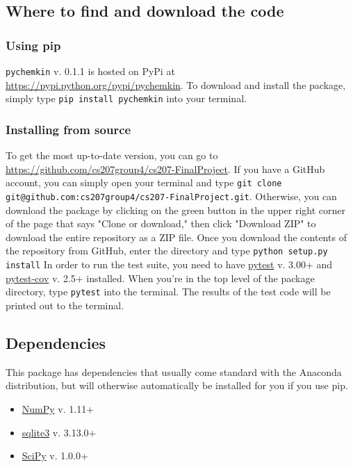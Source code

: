 \documentclass[12pt]{article}
\begin{document}
\subsection{Where to find and download the code}
\subsubsection{Using pip}
\texttt{pychemkin} v. 0.1.1 is hosted on PyPi at \url{https://pypi.python.org/pypi/pychemkin}. To download and install the package, simply type 
\texttt{pip install pychemkin} into your terminal.
\subsubsection{Installing from source}

To get the most up-to-date version, you can go to \url{https://github.com/cs207group4/cs207-FinalProject}. If you have a GitHub account, you can simply open your terminal and type {\tt git clone git@github.com:cs207group4/cs207-FinalProject.git}. Otherwise, you can download the package by clicking on the green button in the upper right corner of the page that says "Clone or download," then click "Download ZIP" to download the entire repository as a ZIP file. Once you download the contents of the repository from GitHub, enter the directory and type {\tt python setup.py install} In order to run the test suite, you need to have \href{https://docs.pytest.org/en/latest/}{pytest} v. 3.00+ and \href{https://pypi.python.org/pypi/pytest-cov}{pytest-cov} v. 2.5+ installed. When you're in the top level of the package directory, type {\tt pytest} into the terminal. The results of the test code will be printed out to the terminal.
 \newline

\subsection{Dependencies}

This package has dependencies that usually come standard with the Anaconda distribution, but will otherwise automatically be installed for you if you use pip.
\begin{itemize}
\item \href{http://www.numpy.org/}{NumPy} v. 1.11+
\item \href{https://www.sqlite.org/}{sqlite3} v. 3.13.0+
\item \href{https://www.scipy.org/}{SciPy} v. 1.0.0+
\end{itemize}
\end{document}
